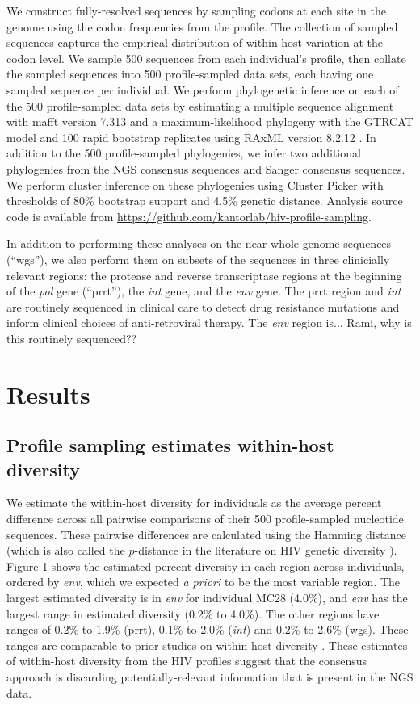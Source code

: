 \documentclass[letterpaper]{article}
\begin{document}
We construct fully-resolved sequences by sampling codons at each site in the genome using the codon frequencies from the profile. The collection of sampled sequences captures the empirical distribution of within-host variation at the codon level. We sample 500 sequences from each individual's profile, then collate the sampled sequences into 500 profile-sampled data sets, each having one sampled sequence per individual. We perform phylogenetic inference on each of the 500 profile-sampled data sets by estimating a multiple sequence alignment with mafft version 7.313 \parencite{katoh} and a maximum-likelihood phylogeny with the GTRCAT model and 100 rapid bootstrap replicates using RAxML version 8.2.12 \parencite{stamatakis}. In addition to the 500 profile-sampled phylogenies, we infer two additional phylogenies from the NGS consensus sequences and Sanger consensus sequences. We perform cluster inference on these phylogenies using Cluster Picker \parencite{ragonnet-cronin} with thresholds of 80\% bootstrap support and 4.5\% genetic distance. Analysis source code is available from \url{https://github.com/kantorlab/hiv-profile-sampling}.

In addition to performing these analyses on the near-whole genome sequences (``wgs''), we also perform them on subsets of the sequences in three clinicially relevant regions: the protease and reverse transcriptase regions at the beginning of the \emph{pol} gene (``prrt''), the \emph{int} gene, and the \emph{env} gene. The prrt region and \emph{int} are routinely sequenced in clinical care to detect drug resistance mutations and inform clinical choices of anti-retroviral therapy. The \emph{env} region is... Rami, why is this routinely sequenced??

\section*{Results}

\subsection*{Profile sampling estimates within-host diversity}

We estimate the within-host diversity for individuals as the average percent difference across all pairwise comparisons of their 500 profile-sampled nucleotide sequences. These pairwise differences are calculated using the Hamming distance \parencite{allam} (which is also called the $p$-distance in the literature on HIV genetic diversity \parencite{maldarelli, hassan}). Figure 1 shows the estimated percent diversity in each region across individuals, ordered by \emph{env}, which we expected \emph{a priori} to be the most variable region. The largest estimated diversity is in \emph{env} for individual MC28 (4.0\%), and \emph{env} has the largest range in estimated diversity (0.2\% to 4.0\%). The other regions have ranges of 0.2\% to 1.9\% (prrt), 0.1\% to 2.0\% (\emph{int}) and 0.2\% to 2.6\% (wgs). These ranges are comparable to prior studies on within-host diversity \parencite{li, zanini}. These estimates of within-host diversity from the HIV profiles suggest that the consensus approach is discarding potentially-relevant information that is present in the NGS data.
\end{document}
